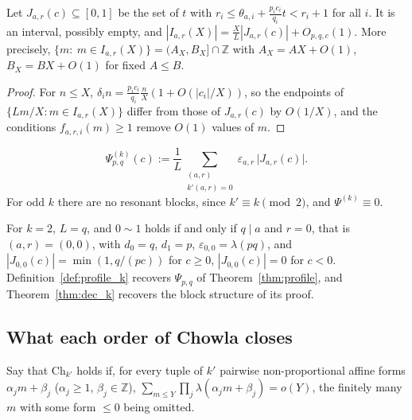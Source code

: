 \begin{lemma}
\label{lem:len_k}
Let $J_{a,r}(c)\subseteq[0,1]$ be the set of $t$ with $r_i\le\theta_{a,i}+\frac{p_ic_i}{q_i}t<r_i+1$ for all $i$. It is an interval, possibly empty, and $|I_{a,r}(X)|=\frac XL|J_{a,r}(c)|+O_{p,q,c}(1)$. More precisely, $\{m:\ m\in I_{a,r}(X)\}=(A_X,B_X]\cap\mathbb Z$ with $A_X=AX+O(1)$, $B_X=BX+O(1)$ for fixed $A\le B$.
\end{lemma}

\begin{proof}
For $n\le X$, $\delta_in=\frac{p_ic_i}{q_i}\frac nX(1+O(|c_i|/X))$, so the endpoints of $\{Lm/X: m\in I_{a,r}(X)\}$ differ from those of $J_{a,r}(c)$ by $O(1/X)$, and the conditions $f_{a,r,i}(m)\ge1$ remove $O(1)$ values of $m$.
\end{proof}

\begin{definition}
\label{def:profile_k}
\begin{equation}
\Psi^{(k)}_{p,q}(c):=\frac1L\sum_{\substack{(a,r)\\ k'(a,r)=0}}\varepsilon_{a,r}\,\bigl|J_{a,r}(c)\bigr| .
\label{eq:profile_k}
\end{equation}
For odd $k$ there are no resonant blocks, since $k'\equiv k\pmod2$, and $\Psi^{(k)}\equiv0$.
\end{definition}

\begin{remark}[$k=2$]
\label{rem:k2}
For $k=2$, $L=q$, and $0\sim1$ holds if and only if $q\mid a$ and $r=0$, that is $(a,r)=(0,0)$, with $d_0=q$, $d_1=p$, $\varepsilon_{0,0}=\lambda(pq)$, and $|J_{0,0}(c)|=\min(1,q/(pc))$ for $c\ge0$, $|J_{0,0}(c)|=0$ for $c<0$. Definition~\ref{def:profile_k} recovers $\Psi_{p,q}$ of Theorem~\ref{thm:profile}, and Theorem~\ref{thm:dec_k} recovers the block structure of its proof.
\end{remark}

\subsection{What each order of Chowla closes}
\label{subsec:kpoint_suff}

Say that $\mathrm{Ch}_{k'}$ holds if, for every tuple of $k'$ pairwise non-proportional affine forms $\alpha_jm+\beta_j$ ($\alpha_j\ge1$, $\beta_j\in\mathbb Z$), $\sum_{m\le Y}\prod_{j}\lambda(\alpha_jm+\beta_j)=o(Y)$, the finitely many $m$ with some form $\le0$ being omitted.

